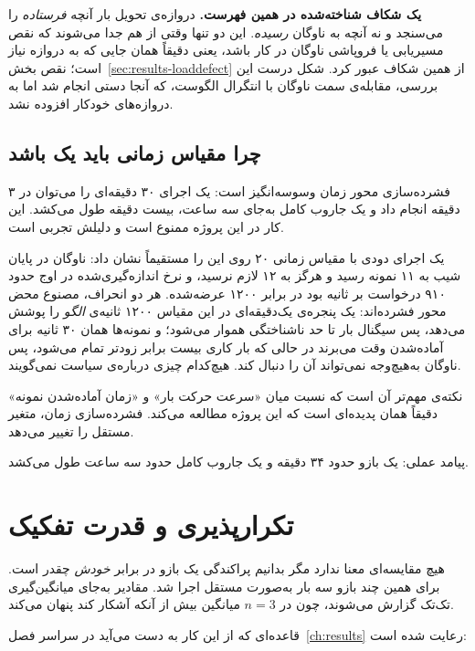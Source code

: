 \textbf{یک شکاف شناخته‌شده در همین فهرست.}
\label{sec:validity-gate-gap}
دروازه‌ی تحویل بار آنچه  \emph{فرستاده} را می‌سنجد و نه آنچه به ناوگان \emph{رسیده}.
این دو تنها وقتی از هم جدا می‌شوند که نقص مسیریابی یا فروپاشی ناوگان در کار باشد، یعنی
دقیقاً همان جایی که به دروازه نیاز است؛ نقص بخش~\ref{sec:results-loaddefect} از همین شکاف
عبور کرد. شکل درست این بررسی، مقابله‌ی  سمت
ناوگان با انتگرال الگوست، که آنجا دستی انجام شد اما به دروازه‌های خودکار افزوده نشد.

\subsection{چرا مقیاس زمانی باید یک باشد}
\label{sec:method-timescale}

فشرده‌سازی محور زمان وسوسه‌انگیز است: یک اجرای ۳۰ دقیقه‌ای را می‌توان در ۳ دقیقه انجام داد و
یک جاروب کامل به‌جای سه ساعت، بیست دقیقه طول می‌کشد. این کار در این پروژه ممنوع است و دلیلش
تجربی است.

یک اجرای دودی با مقیاس زمانی ۲۰ روی  این را مستقیماً نشان داد: ناوگان در پایان
شیب به ۱۱ نمونه رسید و هرگز به ۱۲ لازم نرسید، و نرخ اندازه‌گیری‌شده در اوج حدود ۹۱۰ درخواست
بر ثانیه بود در برابر ۱۲۰۰ عرضه‌شده. هر دو انحراف، مصنوع محض محور فشرده‌اند: یک پنجره‌ی
 یک‌دقیقه‌ای در این مقیاس ۱۲۰۰ ثانیه‌ی \emph{الگو} را پوشش می‌دهد، پس سیگنال بار
تا حد ناشناختگی هموار می‌شود؛ و نمونه‌ها همان ۳۰ ثانیه برای آماده‌شدن وقت می‌برند در حالی که
بار کاری بیست برابر زودتر تمام می‌شود، پس ناوگان به‌هیچ‌وجه نمی‌تواند آن را دنبال کند.
هیچ‌کدام چیزی درباره‌ی سیاست نمی‌گویند.

نکته‌ی مهم‌تر آن است که نسبت میان «سرعت حرکت بار» و «زمان آماده‌شدن نمونه» دقیقاً همان پدیده‌ای
است که این پروژه مطالعه می‌کند. فشرده‌سازی زمان، متغیر مستقل را تغییر می‌دهد.

پیامد عملی: یک بازو حدود ۳۴ دقیقه و یک جاروب کامل حدود سه ساعت طول می‌کشد.

\section{تکرارپذیری و قدرت تفکیک}
\label{sec:method-repeatability}

هیچ مقایسه‌ای معنا ندارد مگر بدانیم پراکندگی یک بازو در برابر \emph{خودش} چقدر است. برای همین
چند بازو سه بار به‌صورت مستقل اجرا شد. مقادیر به‌جای میانگین‌گیری تک‌تک گزارش می‌شوند، چون در
$n = 3$ میانگین بیش از آنکه آشکار کند پنهان می‌کند.

قاعده‌ای که از این کار به دست می‌آید در سراسر فصل~\ref{ch:results} رعایت شده است:


